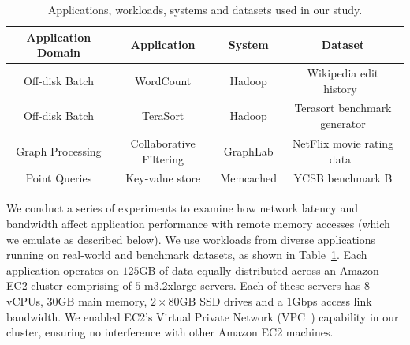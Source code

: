 %
\begin{table}
  \centering
  \small
  \begin{tabular}{c|c|c|c}
		\textbf{Application Domain} & \textbf{Application} & \textbf{System} & \textbf{Dataset} \\\hline \hline
    Off-disk Batch & WordCount & Hadoop & Wikipedia edit history~\cite{wikipedia}\\\hline
    Off-disk Batch & TeraSort & Hadoop & Terasort benchmark generator\\\hline
    Graph Processing & Collaborative Filtering & GraphLab & NetFlix movie rating data~\cite{netflix}\\\hline
    Point Queries & Key-value store & Memcached & YCSB benchmark B\\\hline
    \hline
  \end{tabular}
  \vspace{0.1in}
  \caption{\small{Applications, workloads, systems and datasets used in our study.}}
  \label{tab:workloads}
\end{table}

%

We conduct a series of experiments to examine how network latency and bandwidth affect application performance with remote memory accesses (which we emulate as described below). 
We use workloads from diverse applications running on real-world and benchmark datasets, as shown in Table~\ref{tab:workloads}. %
 Each application operates on $125$GB of data equally distributed across an Amazon EC2 cluster comprising of $5$ m3.2xlarge servers. Each of these servers has $8$ vCPUs, $30$GB main memory, $2 \times 80$GB SSD drives and a $1$Gbps access link bandwidth.
 We enabled EC2's Virtual Private Network (VPC~\cite{vpc}) capability in our cluster, ensuring no interference with other Amazon EC2 machines. 



